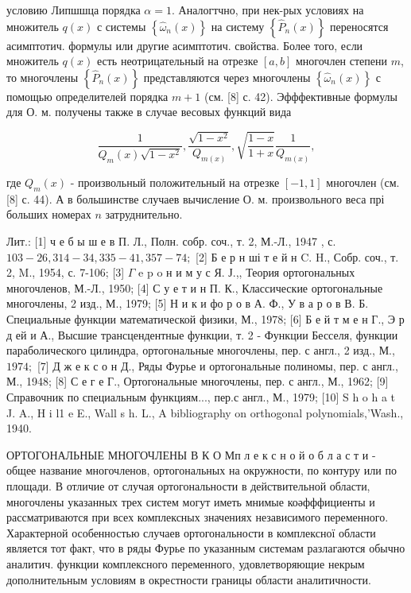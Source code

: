 \documentclass[10pt]{article}
\begin{document}
условию Липшшца порядка $\alpha=1$. Аналогтчно, при нек-рых условиях на множитель $q(x)$ с системы $\left\{\hat{\omega}_{n}(x)\right\}$ на систему $\left\{\hat{P}_{n}(x)\right\}$ переносятся асимптотич. формулы или другие асимптотич. свойства. Более того, если множитель $q(x)$ есть неотрицательный на отрезке $[a, b]$ многочлен степени $m$, то многочлены $\left\{\hat{P}_{n}(x)\right\}$ представляются через многочлены $\left\{\hat{\omega}_{n}(x)\right\}$ с помощью определителей порядка $m+1$ (см. [8] с. 42). Эфффективные формулы для О. м. получены также в случае весовых функций вида

\[
\frac{1}{Q_{m}(x) \sqrt{1-x^{2}}}, \frac{\sqrt{1-x^{2}}}{Q_{m(x)}}, \sqrt{\frac{1-x}{1+x}} \frac{1}{Q_{m(x)}},
\]

где $Q_{m}(x)$ - произвольный положительный на отрезке $[-1,1]$ многочлен (см. [8] с. 44). А в большинстве случаев вычисление О. м. произвольного веса прі больших номерах $n$ затруднительно.

Лит.: [1] ч е б ы ш е в П. Л., Полн. собр. соч., т. 2, М.-Л., 1947 , с. $103-26,314-34,335-41,357-74 ;$ [2] Б е р н ші т е й н C. H., Собр. соч., т. 2, M., 1954, с. 7-106; [3] $\Gamma$ e p o н и м у с Я. Ј.,, Теория ортогональных многочленов, М.-Л., 1950; [4] С у е т и н П. К., Классические ортогональные многочлены, 2 изд., М., 1979; [5] Н и к и фо р о в А. Ф., У в а р о в В. Б. Специальные функции математической физики, М., 1978; [6] Б е й т м е н Г., Э р д ей и А., Высшие трансцендентные функции, т. 2 - Функции Бесселя, функции параболического цилиндра, ортогональные многочлены, пер. с англ., 2 изд., М., $1974 ;$ [7] Д ж е к с о н Д., Ряды Фурье и ортогональные полиномы, пер. с англ., М., 1948; [8] С е г е Г., Ортогональные многочлены, пер. с англ., М., 1962; [9] Справочник по специальным функциям..., пер.с англ., М., 1979; [10] S h o h a t J. A., H i l1 e E., Wall s $\mathrm{h}$. L., A bibliography on orthogonal polynomials,'Wash., 1940.

ОРТОГОНАЛЬНЫЕ МНОГОЧЛЕНЫ В К О Мп л е к с н о й о б л а с т и - общее название многочленов, ортогональных на окружности, по контуру или по площади. В отличие от случая ортогональности в действительной области, многочлены указанных трех систем могут иметь мнимые коәфффициенты и рассматриваются при всех комплексных значениях независимого переменного. Характерной особенностью случаев ортогональности в комплексної области является тот факт, что в ряды Фурье по указанным системам разлагаются обычно аналитич. функции комплексного переменного, удовлетворяющие некрым дополнительным условиям в окрестности границы области аналитичности.
\end{document}
